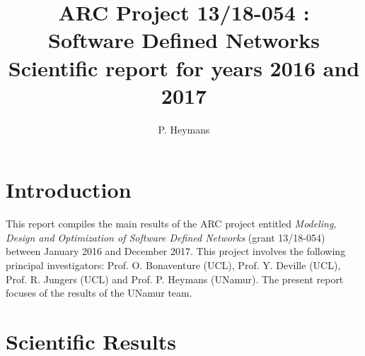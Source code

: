 \documentclass[a4paper]{article}
\title{ARC Project 13/18-054 :\\ Software Defined Networks\\
           Scientific report for years 2016 and 2017}
\author{P. Heymans}
\begin{document}
\maketitle

\section{Introduction}

This report compiles the main results of the ARC project entitled \emph{Modeling, Design and Optimization of Software Defined Networks} (grant 13/18-054)
between January 2016 and December 2017. This project involves the
following principal investigators: Prof. O. Bonaventure (UCL), Prof. Y. Deville (UCL), Prof. R. Jungers (UCL) and Prof. P. Heymans (UNamur). The present report focuses of the results of the UNamur team. 


%

\section{Scientific Results}

%
%
\end{document}

